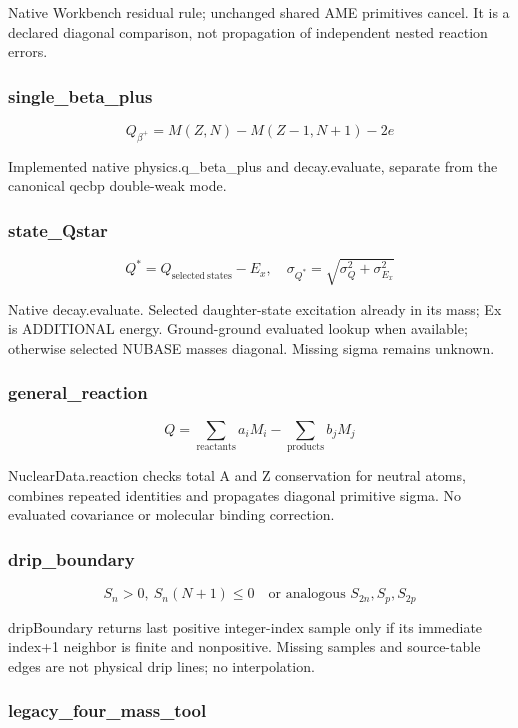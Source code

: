 \documentclass[
  11pt,
  letterpaper,
]{article}
\begin{document}
Native Workbench residual rule; unchanged shared AME primitives cancel.
It is a declared diagonal comparison, not propagation of independent
nested reaction errors.

\subsubsection{single\_beta\_plus}\label{single_beta_plus}

\[
Q_{\beta^+}=M(Z,N)-M(Z-1,N+1)-2e
\]

Implemented native physics.q\_beta\_plus and decay.evaluate, separate
from the canonical qecbp double-weak mode.

\subsubsection{state\_Qstar}\label{state_qstar}

\[
Q^*=Q_{\mathrm{selected\ states}}-E_x,\quad \sigma_{Q^*}=\sqrt{\sigma_Q^2+\sigma_{E_x}^2}
\]

Native decay.evaluate. Selected daughter-state excitation already in its
mass; Ex is ADDITIONAL energy. Ground-ground evaluated lookup when
available; otherwise selected NUBASE masses diagonal. Missing sigma
remains unknown.

\subsubsection{general\_reaction}\label{general_reaction}

\[
Q=\sum_{\mathrm{reactants}}a_i M_i-\sum_{\mathrm{products}}b_j M_j
\]

NuclearData.reaction checks total A and Z conservation for neutral
atoms, combines repeated identities and propagates diagonal primitive
sigma. No evaluated covariance or molecular binding correction.

\subsubsection{drip\_boundary}\label{drip_boundary}

\[
S_n>0,\ S_n(N+1)\leq0\quad\text{or analogous }S_{2n},S_p,S_{2p}
\]

dripBoundary returns last positive integer-index sample only if its
immediate index+1 neighbor is finite and nonpositive. Missing samples
and source-table edges are not physical drip lines; no interpolation.

\subsubsection{legacy\_four\_mass\_tool}\label{legacy_four_mass_tool}
\end{document}
